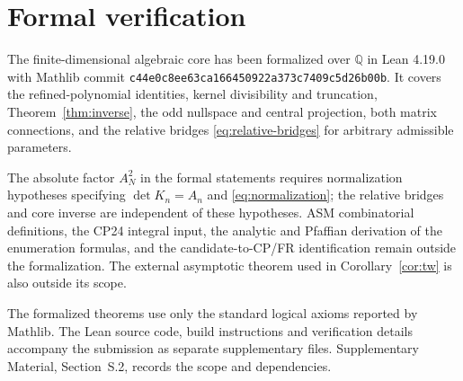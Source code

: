 \documentclass[11pt,a4paper]{amsart}
\theoremstyle{remark}\newtheorem{remark}[theorem]{Remark}
\numberwithin{equation}{section}
\newcommand{\Q}{\mathbb Q}
\begin{document}
\section{Formal verification}\label{sec:lean}
The finite-dimensional algebraic core has been formalized over $\Q$ in Lean 4.19.0 with Mathlib commit
\texttt{c44e0c8ee63ca166450922a373c7409c5d26b00b}. It covers the refined-polynomial identities, kernel divisibility and truncation, Theorem~\ref{thm:inverse}, the odd nullspace and central projection, both matrix connections, and the relative bridges \eqref{eq:relative-bridges} for arbitrary admissible parameters.

The absolute factor $A_N^2$ in the formal statements requires normalization hypotheses specifying $\det K_n=A_n$ and \eqref{eq:normalization}; the relative bridges and core inverse are independent of these hypotheses. ASM combinatorial definitions, the CP24 integral input, the analytic and Pfaffian derivation of the enumeration formulas, and the candidate-to-CP/FR identification remain outside the formalization. The external asymptotic theorem used in Corollary~\ref{cor:tw} is also outside its scope.

The formalized theorems use only the standard logical axioms reported by Mathlib. The Lean source code, build instructions and verification details accompany the submission as separate supplementary files. Supplementary Material, Section~S.2, records the scope and dependencies.

\appendix
\end{document}
